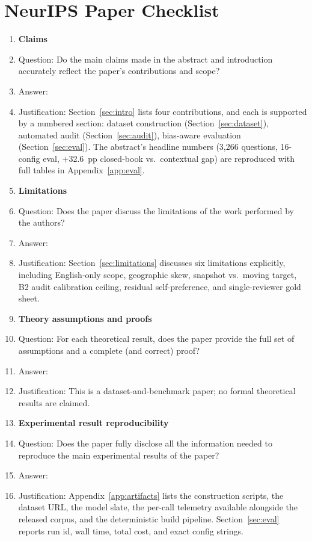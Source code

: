 \section*{NeurIPS Paper Checklist}

\begin{enumerate}

\item {\bf Claims}
    \item[] Question: Do the main claims made in the abstract and introduction accurately reflect the paper's contributions and scope?
    \item[] Answer: \answerYes{}
    \item[] Justification: Section~\ref{sec:intro} lists four contributions, and each is supported by a numbered section: dataset construction (Section~\ref{sec:dataset}), automated audit (Section~\ref{sec:audit}), bias-aware evaluation (Section~\ref{sec:eval}). The abstract's headline numbers (3{,}266 questions, 16-config eval, +32.6~pp closed-book vs.\ contextual gap) are reproduced with full tables in Appendix~\ref{app:eval}.

\item {\bf Limitations}
    \item[] Question: Does the paper discuss the limitations of the work performed by the authors?
    \item[] Answer: \answerYes{}
    \item[] Justification: Section~\ref{sec:limitations} discusses six limitations explicitly, including English-only scope, geographic skew, snapshot vs.\ moving target, B2 audit calibration ceiling, residual self-preference, and single-reviewer gold sheet.

\item {\bf Theory assumptions and proofs}
    \item[] Question: For each theoretical result, does the paper provide the full set of assumptions and a complete (and correct) proof?
    \item[] Answer: \answerNA{}
    \item[] Justification: This is a dataset-and-benchmark paper; no formal theoretical results are claimed.

\item {\bf Experimental result reproducibility}
    \item[] Question: Does the paper fully disclose all the information needed to reproduce the main experimental results of the paper?
    \item[] Answer: \answerYes{}
    \item[] Justification: Appendix~\ref{app:artifacts} lists the construction scripts, the dataset URL, the model slate, the per-call telemetry available alongside the released corpus, and the deterministic build pipeline. Section~\ref{sec:eval} reports run id, wall time, total cost, and exact config strings.


\end{enumerate}

